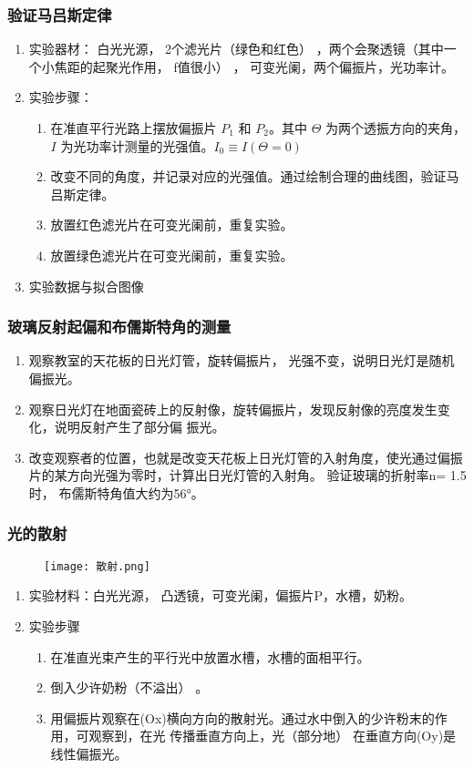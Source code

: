 \documentclass[dvipsnames, svgnames,a4paper,11pt]{article}
\begin{document}
	\subsubsection{验证马吕斯定律}
	\begin{enumerate}
		\item 实验器材： 白光光源， 2个滤光片（绿色和红色） ，两个会聚透镜（其中一个小焦距的起聚光作用，
		f值很小） ， 可变光阑，两个偏振片，光功率计。
		\item 实验步骤：
	\begin{enumerate}
		 \item 在准直平行光路上摆放偏振片 $P_1$ 和 $P_2$。其中 $\Theta$ 为两个透振方向的夹角，$I$ 为光功率计测量的光强值。$I_0\equiv I(\Theta=0)$

		\item 改变不同的角度，并记录对应的光强值。通过绘制合理的曲线图，验证马吕斯定律。
		\item 放置红色滤光片在可变光阑前，重复实验。
		\item 放置绿色滤光片在可变光阑前，重复实验。
	\end{enumerate}	
	\item 实验数据与拟合图像


	\end{enumerate}
	
	\subsubsection{玻璃反射起偏和布儒斯特角的测量}
	\begin{enumerate}
		\item 观察教室的天花板的日光灯管，旋转偏振片， 光强不变，说明日光灯是随机偏振光。
		\item 观察日光灯在地面瓷砖上的反射像，旋转偏振片，发现反射像的亮度发生变化，说明反射产生了部分偏
		振光。
		\item 改变观察者的位置，也就是改变天花板上日光灯管的入射角度，使光通过偏振片的某方向光强为零时，计算出日光灯管的入射角。 验证玻璃的折射率n= 1.5时， 布儒斯特角值大约为56°。
	\end{enumerate}
	\subsubsection{光的散射}
	\begin{figure}[{H}]
		\centering
		\texttt{[image: 散射.png]}
	
		\label{}
	\end{figure}
	\begin{enumerate}
		\item 实验材料：白光光源， 凸透镜，可变光阑，偏振片P，水槽，奶粉。
		\item 实验步骤
		\begin{enumerate}
			\item 在准直光束产生的平行光中放置水槽，水槽的面相平行。
			\item 倒入少许奶粉（不溢出） 。
			\item 用偏振片观察在(Ox)横向方向的散射光。通过水中倒入的少许粉末的作用，可观察到，在光
			传播垂直方向上，光（部分地） 在垂直方向(Oy)是线性偏振光。
		\end{enumerate}
	\end{enumerate}
\end{document}
